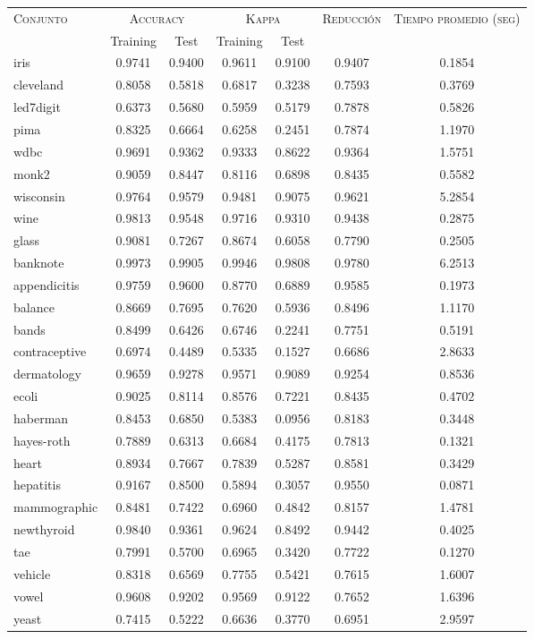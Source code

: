 \begin{table}[]
\centering
\begin{tabular}{l c c c c c c}
\hline
\multirow{2}{*}{\textsc{Conjunto}}
	& \multicolumn{2}{c}{\textsc{Accuracy}}
	& \multicolumn{2}{c}{\textsc{Kappa}}
	& \textsc{Reducción}
	& \textsc{Tiempo promedio (seg)} \\
	& Training & Test
	& Training & Test \\ 
\hline
\hline

iris & 0.9741 & 0.9400 & 0.9611 & 0.9100 & 0.9407 & 0.1854 \\
cleveland & 0.8058 & 0.5818 & 0.6817 & 0.3238 & 0.7593 & 0.3769 \\
led7digit & 0.6373 & 0.5680 & 0.5959 & 0.5179 & 0.7878 & 0.5826 \\
pima & 0.8325 & 0.6664 & 0.6258 & 0.2451 & 0.7874 & 1.1970 \\
wdbc & 0.9691 & 0.9362 & 0.9333 & 0.8622 & 0.9364 & 1.5751 \\
monk2 & 0.9059 & 0.8447 & 0.8116 & 0.6898 & 0.8435 & 0.5582 \\
wisconsin & 0.9764 & 0.9579 & 0.9481 & 0.9075 & 0.9621 & 5.2854 \\
wine & 0.9813 & 0.9548 & 0.9716 & 0.9310 & 0.9438 & 0.2875 \\
glass & 0.9081 & 0.7267 & 0.8674 & 0.6058 & 0.7790 & 0.2505 \\
banknote & 0.9973 & 0.9905 & 0.9946 & 0.9808 & 0.9780 & 6.2513 \\
appendicitis & 0.9759 & 0.9600 & 0.8770 & 0.6889 & 0.9585 & 0.1973 \\
balance & 0.8669 & 0.7695 & 0.7620 & 0.5936 & 0.8496 & 1.1170 \\
bands & 0.8499 & 0.6426 & 0.6746 & 0.2241 & 0.7751 & 0.5191 \\
contraceptive & 0.6974 & 0.4489 & 0.5335 & 0.1527 & 0.6686 & 2.8633 \\
dermatology & 0.9659 & 0.9278 & 0.9571 & 0.9089 & 0.9254 & 0.8536 \\
ecoli & 0.9025 & 0.8114 & 0.8576 & 0.7221 & 0.8435 & 0.4702 \\
haberman & 0.8453 & 0.6850 & 0.5383 & 0.0956 & 0.8183 & 0.3448 \\
hayes-roth & 0.7889 & 0.6313 & 0.6684 & 0.4175 & 0.7813 & 0.1321 \\
heart & 0.8934 & 0.7667 & 0.7839 & 0.5287 & 0.8581 & 0.3429 \\
hepatitis & 0.9167 & 0.8500 & 0.5894 & 0.3057 & 0.9550 & 0.0871 \\
mammographic & 0.8481 & 0.7422 & 0.6960 & 0.4842 & 0.8157 & 1.4781 \\
newthyroid & 0.9840 & 0.9361 & 0.9624 & 0.8492 & 0.9442 & 0.4025 \\
tae & 0.7991 & 0.5700 & 0.6965 & 0.3420 & 0.7722 & 0.1270 \\
vehicle & 0.8318 & 0.6569 & 0.7755 & 0.5421 & 0.7615 & 1.6007 \\
vowel & 0.9608 & 0.9202 & 0.9569 & 0.9122 & 0.7652 & 1.6396 \\
yeast & 0.7415 & 0.5222 & 0.6636 & 0.3770 & 0.6951 & 2.9597 \\


\end{tabular}
\end{table}
